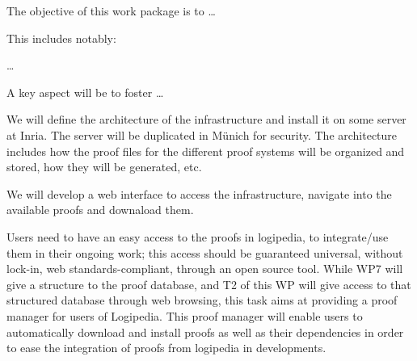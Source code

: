 \begin{workpackage}[id=access,wphases=0-48,type=MGT,
  short=Access,%
  title={Access to the infrastructure},
  lead=Inr,
  InrRM=28,
  OcaRM=6]

\begin{wpobjectives}
  The objective of this work package is to \ldots

This includes notably:
  \begin{compactitem}
  \item \ldots
  \end{compactitem}
  A key aspect will be to foster \ldots
\end{wpobjectives}

\begin{wpdescription}

\end{wpdescription}

\begin{tasklist}

  \begin{task}[id=basic,title=Defining the architecture of the infrastructure]
    We will define the architecture of the infrastructure and install
    it on some server at Inria. The server will be duplicated in
    Münich for security. The architecture includes how the proof files
    for the different proof systems will be organized and stored, how
    they will be generated, etc.
  \end{task}

  \begin{task}[id=web,title=Giving access to the infrastructure on the world-wide web]
    We will develop a web interface to access the infrastructure,
    navigate into the available proofs and downaload them.
  \end{task}

  \begin{task}[id=opam,title=Giving access to the infrastructure in proof tools]
    Users need to have an easy access to the proofs in logipedia, to integrate/use
    them in their ongoing work; this access should be guaranteed universal, without
    lock-in, web standards-compliant, through an open source tool. While WP7
    will give a structure to the proof database, and T2 of this WP will give access
    to that structured database through web browsing, this task aims at
    providing a proof manager for users of Logipedia. This proof manager
    will enable users to automatically download and install proofs as well as their
    dependencies in order to ease the integration of proofs from logipedia in
    developments.


\end{task}
\end{tasklist}
\end{workpackage}
